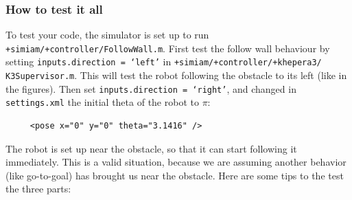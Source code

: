 \documentclass[10pt]{article}
\begin{document}
\subsubsection*{How to test it all}

To test your code, the simulator is set up to run \texttt{+simiam/+controller/FollowWall.m}. First test the follow wall behaviour by setting \texttt{inputs.direction = `left'} in \texttt{+simiam/+controller/+khepera3/} \texttt{K3Supervisor.m}. This will test the robot following the obstacle to its left (like in the figures). Then set \texttt{inputs.direction = `right'}, and changed in \texttt{settings.xml} the initial theta of the robot to $\pi$:
\begin{verbatim}
     <pose x="0" y="0" theta="3.1416" />
\end{verbatim}
The robot is set up near the obstacle, so that it can start following it immediately. This is a valid situation, because we are assuming another behavior (like go-to-goal) has brought us near the obstacle. Here are some tips to the test the three parts:
\end{document}
